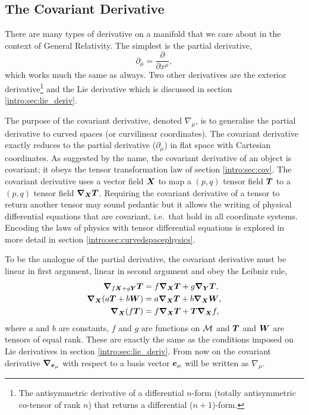 \subsection{The Covariant Derivative}\label{intro:sec:covariant_derivative}

There are many types of derivative on a manifold that we care about in the context of General Relativity. The simplest is the partial derivative, 
\begin{equation}
\partial_\mu = \frac{\partial}{\partial x^\mu},
\end{equation} 
which works much the same as always. Two other derivatives are the exterior derivative\footnote{The antisymmetric derivative of a differential $n$-form (totally antisymmetric co-tensor of rank $n$) that returns a differential ($n+1$)-form. } and the Lie derivative which is discussed in section \ref{intro:sec:lie_deriv}. 

The purpose of the covariant derivative, denoted $\nabla_\mu$, is to generalise the partial derivative to curved spaces (or curvilinear coordinates). The covariant derivative exactly reduces to the partial derivative ($\partial_\mu$) in flat space with Cartesian coordinates. As suggested by the name, the covariant derivative of an object is covariant; it obeys the tensor transformation law of section \ref{intro:sec:cov}. The covariant derivative uses a vector field $\boldsymbol{X}$ to map a $(p,q)$ tensor field $\boldsymbol{T}$ to 
 a $(p,q)$ tensor field ${\boldsymbol{\nabla}_{\boldsymbol{X}}} \boldsymbol{T}$. Requiring the covariant derivative of a tensor to return another tensor may sound pedantic but it allows the writing of physical differential equations that are covariant, i.e.~that hold in all coordinate systems. Encoding the laws of physics with tensor differential equations is explored in more detail in section \ref{intro:sec:curvedspacephysics}. 

To be the analogue of the partial derivative, the covariant derivative must be linear in first argument, linear in second argument and obey the Leibniz rule,
\begin{align}
\label{intro:eq:cov-lin}\boldsymbol{\nabla}_{f\boldsymbol{X} + g\boldsymbol{Y}}\boldsymbol{T} &= f\boldsymbol{\nabla}_{\boldsymbol{X}}\boldsymbol{T} + g\boldsymbol{\nabla}_{\boldsymbol{Y}}\boldsymbol{T} , \\
\label{intro:eq:cov-ass}\boldsymbol{\nabla}_{\boldsymbol{X}}( a\boldsymbol{T} + b\boldsymbol{W}) &= a\boldsymbol{\nabla}_{\boldsymbol{X}}\boldsymbol{T} + b\boldsymbol{\nabla}_{\boldsymbol{X}}\boldsymbol{W} , \\
\label{intro:eq:cov-pro}\boldsymbol{\nabla}_{\boldsymbol{X}}( f\boldsymbol{T}) &= f\boldsymbol{\nabla}_{\boldsymbol{X}}\boldsymbol{T} + \boldsymbol{T} \boldsymbol{\nabla}_{\boldsymbol{X}}f , 
\end{align}
where $a$ and $b$ are constants, $f$ and $g$ are functions on $\mathcal{M}$ and $\boldsymbol{T}$ and $\boldsymbol{W}$ are tensors of equal rank. These are exactly the same as the conditions imposed on Lie derivatives in section \ref{intro:sec:lie_deriv}. From now on the covariant derivative $\boldsymbol{\nabla}_{\boldsymbol{e}_\mu}$ with respect to a basis vector $\boldsymbol{e}_\mu$ will be written as $\nabla_\mu$.

